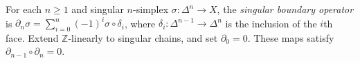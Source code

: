 
For each $n\ge1$ and singular $n$-simplex $\sigma:\Delta^n\to X$, the \emph{singular boundary operator} is $\partial_n\sigma=\sum_{i=0}^n(-1)^i\sigma\circ\delta_i$, where $\delta_i:\Delta^{n-1}\to\Delta^n$ is the inclusion of the $i$th face. Extend $\mathbb Z$-linearly to singular chains, and set $\partial_0=0$. These maps satisfy $\partial_{n-1}\circ\partial_n=0$.
